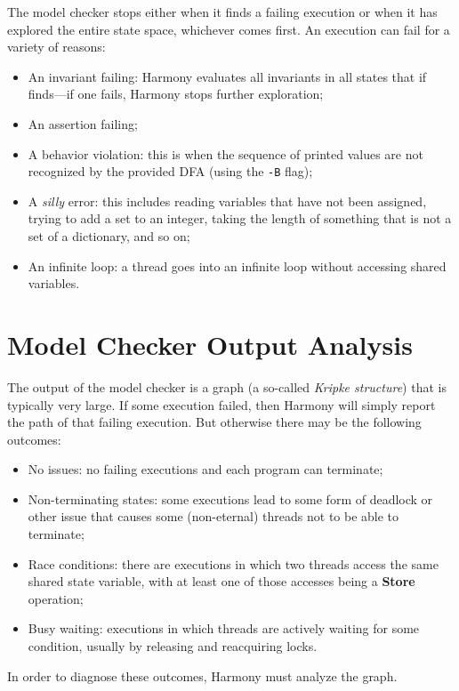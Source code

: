 \documentclass{report}
\begin{document}
The model checker stops either when it finds a failing execution or when
it has explored the entire state space, whichever comes first.  An execution
can fail for a variety of reasons:

\begin{itemize}
\item An invariant failing: Harmony evaluates all invariants in all states
that if finds---if one fails, Harmony stops further exploration;
\item An assertion failing;
\item A behavior violation: this is when the sequence of printed values
are not recognized by the provided DFA (using the \texttt{-B} flag);
\item A \emph{silly} error: this includes reading variables that have not
been assigned, trying to add a set to an integer, taking the length of
something that is not a set of a dictionary, and so on;
\item An infinite loop: a thread goes into an infinite loop without
accessing shared variables.
\end{itemize}

\section{Model Checker Output Analysis}

%
The output of the model checker is a graph (a so-called \emph{Kripke
structure}) that is typically very large.
If some execution failed, then Harmony will simply report the path of
that failing execution.  But otherwise there may be the following
outcomes:

\begin{itemize}
\item No issues: no failing executions and each program can terminate;
\item Non-terminating states: some executions lead to some form of deadlock
or other issue that causes some (non-eternal) threads not to be able to
terminate;
\item Race conditions: there are executions in which two threads access
the same shared state variable, with at least one of those accesses being a
\textbf{Store} operation;
\item Busy waiting: executions in which threads are actively waiting for
some condition, usually by releasing and reacquiring locks.
\end{itemize}

\noindent
In order to diagnose these outcomes, Harmony must analyze the graph.
\end{document}

